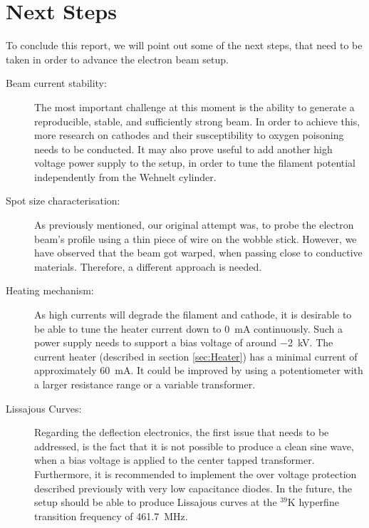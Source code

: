 
\chapter{Next Steps}
 
To conclude this report, we will point out some of the next steps, that need to be taken in order to advance the electron beam setup. 

\begin{description}
	\item[Beam current stability:] The most important challenge at this moment is the ability to generate a reproducible, stable, and sufficiently strong beam. In order to achieve this, more research on cathodes and their susceptibility to oxygen poisoning needs to be conducted. It may also prove useful to add another high voltage power supply to the setup, in order to tune the filament potential independently from the Wehnelt cylinder. 
	\item[Spot size characterisation:] As previously mentioned, our original attempt was, to probe the electron beam's profile using a thin piece of wire on the wobble stick. However, we have observed that the beam got warped, when passing close to conductive materials. Therefore, a different approach is needed. 
	\item[Heating mechanism:] As high currents will degrade the filament and cathode, it is desirable to be able to tune the heater current down to \SI{0}{\milli\ampere} continuously. Such a power supply needs to support a bias voltage of around \SI{-2}{\kilo\volt}. The current heater (described in section \cref{sec:Heater}) has a minimal current of approximately \SI{60}{\milli\ampere}. It could be improved by using a potentiometer with a larger resistance range or a variable transformer. 
	\item[Lissajous Curves:] Regarding the deflection electronics, the first issue that needs to be addressed, is the fact that it is not possible to produce a clean sine wave, when a bias voltage is applied to the center tapped transformer. Furthermore, it is recommended to implement the over voltage protection described previously with very low capacitance diodes.  
	In the future, the setup should be able to produce Lissajous curves at the  $^{39}\mathrm{K}$ hyperfine transition frequency of \SI{461.7}{\mega\hertz}. 

\end{description}
